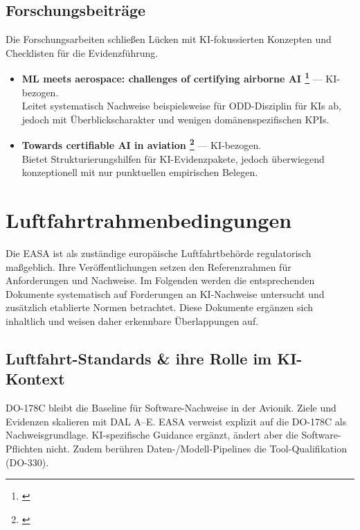 \section{Forschungsbeiträge}
Die Forschungsarbeiten schließen Lücken mit KI-fokussierten Konzepten und Checklisten für die Evidenzführung.

\medskip
\begin{itemize}
  \item \textbf{ML meets aerospace: challenges of certifying airborne AI \footnote{ \parencite{ml-meets-aerospace-2024}}} — KI-bezogen.\\
  Leitet systematisch Nachweise beispielsweise für ODD-Disziplin für KIs ab, jedoch mit Überblickscharakter und wenigen domänenspezifischen KPIs.
  \item \textbf{Towards certifiable AI in aviation \footnote{ \parencite{towards-certifiable-ai-aviation-2024}}} — KI-bezogen.\\
  Bietet Strukturierungshilfen für KI-Evidenzpakete, jedoch überwiegend konzeptionell mit nur punktuellen empirischen Belegen.
\end{itemize}




\chapter{Luftfahrtrahmenbedingungen}\label{chap:anf-avi}

Die EASA ist als zuständige europäische Luftfahrtbehörde regulatorisch maßgeblich. 
Ihre Veröffentlichungen setzen den Referenzrahmen für Anforderungen und Nachweise. 
Im Folgenden werden die entsprechenden Dokumente systematisch auf Forderungen an 
KI-Nachweise untersucht und zusätzlich etablierte Normen betrachtet. Diese Dokumente 
ergänzen sich inhaltlich und weisen daher erkennbare Überlappungen auf.





\section{Luftfahrt-Standards \& ihre Rolle im KI-Kontext}
DO-178C bleibt die Baseline für Software-Nachweise in der Avionik. Ziele und Evidenzen skalieren mit 
DAL A–E. EASA verweist explizit auf die DO-178C als Nachweisgrundlage. 
KI-spezifische Guidance ergänzt, ändert aber die Software-Pflichten nicht. 
Zudem berühren Daten-/Modell-Pipelines die Tool-Qualifikation (DO-330).

